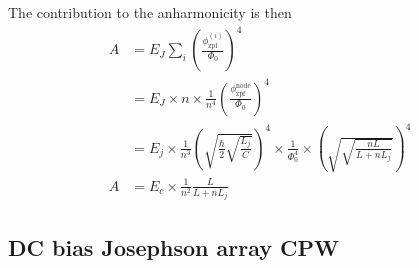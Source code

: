 The contribution to the anharmonicity is then
\begin{align}
A&=E_J \sum_{i} \left( \frac{\phi_\text{zpf}^{(i)}}{\Phi_0} \right)^4 \\
&=E_J \times n \times \frac{1}{n^4} \left( \frac{\phi_\text{zpf}^\text{node}}{\Phi_0} \right)^4 \\
&= E_j\times\frac{1}{n^3} \left( \sqrt{\frac{\hbar}{2} \sqrt{\frac{L_j}{C}} } \right)^4 \times \frac{1}{\Phi_0^4} \times \left( \sqrt{\sqrt{\frac{nL}{L+nL_j}}} \right)^4 \\
A&= E_c \times \frac{1}{n^2}\frac{L}{L+nL_j}
\end{align}

\subsection{DC bias Josephson array CPW}\label{sec:array}

